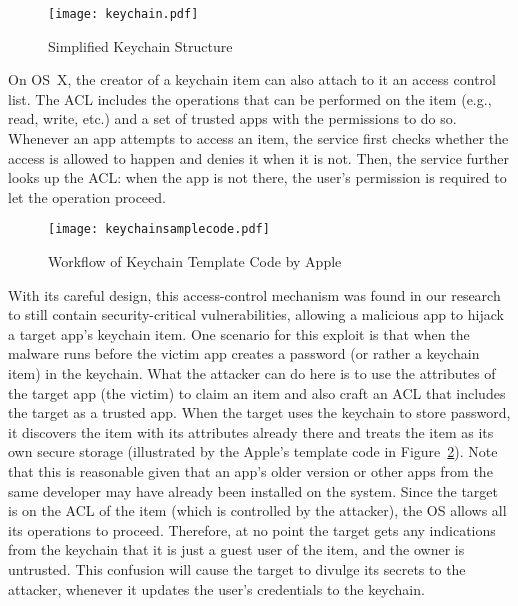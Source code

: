 \documentclass{article}
\newcommand{\ignore}[1]{}
\begin{document}
\begin{figure}[h]
\centering
\vspace{-8pt}
\texttt{[image: keychain.pdf]}
\vspace{-10pt}
\vspace{-2pt}
\caption{Simplified Keychain Structure}
\label{fig:keychain}

\vspace{-10pt}
\end{figure} 

On OS~X, the creator of a keychain item can also attach to it an access control list\ignore{, using the function \texttt{SecAccessCreate}}. The ACL includes the operations that can be performed on the item (e.g., read, write, etc.) and a set of trusted apps with the permissions to do so. Whenever an app attempts to access an item, the service first checks whether the access is allowed to happen and denies it when it is not. Then, the service further looks up the ACL: when the app is not there, the user's permission is required to let the operation proceed.

\begin{figure}[h]
\centering
\texttt{[image: keychainsamplecode.pdf]}
\vspace{-10pt}
\vspace{-2pt}
\caption{Workflow of Keychain Template Code by Apple}
\label{fig:keychainsample}

\end{figure} 


With its careful design, this access-control mechanism was found in our research to still contain security-critical vulnerabilities, allowing a malicious app to hijack a target app's keychain item. One scenario for this exploit is that when the malware runs before the victim app creates a password (or rather a keychain item) in the keychain. What the attacker can do here is to use the attributes of the target app (the victim) to claim an item and also craft an ACL that includes the target as a trusted app. When the target uses the keychain to store password, it discovers the item with its attributes already there and treats the item as its own secure storage (illustrated by the Apple's template code in Figure~\ref{fig:keychainsample}). Note that this is reasonable given that an app's older version or other apps from the same developer may have already been installed on the system. Since the target is on the ACL of the item (which is controlled by the attacker), the OS allows all its operations to proceed. Therefore, at no point the target gets any indications from the keychain that it is just a guest user of the item, and the owner is untrusted. This confusion will cause the target to divulge its secrets to the attacker, whenever it updates the user's credentials to the keychain. 
\end{document}
